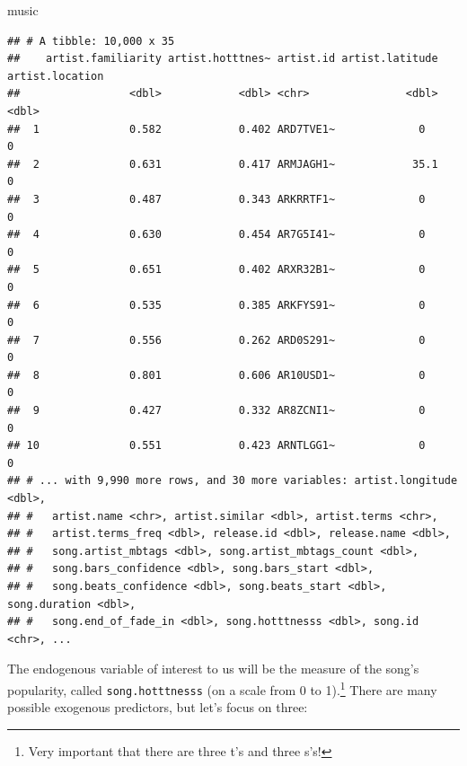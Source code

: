 \documentclass[
]{book}
\newenvironment{Shaded}{\begin{snugshade}}{\end{snugshade}}
\newcommand{\NormalTok}[1]{#1}
\begin{document}
\begin{Shaded}
\begin{Highlighting}[]
\NormalTok{music}
\end{Highlighting}
\end{Shaded}

\begin{verbatim}
## # A tibble: 10,000 x 35
##    artist.familiarity artist.hotttnes~ artist.id artist.latitude artist.location
##                 <dbl>            <dbl> <chr>               <dbl>           <dbl>
##  1              0.582            0.402 ARD7TVE1~             0                 0
##  2              0.631            0.417 ARMJAGH1~            35.1               0
##  3              0.487            0.343 ARKRRTF1~             0                 0
##  4              0.630            0.454 AR7G5I41~             0                 0
##  5              0.651            0.402 ARXR32B1~             0                 0
##  6              0.535            0.385 ARKFYS91~             0                 0
##  7              0.556            0.262 ARD0S291~             0                 0
##  8              0.801            0.606 AR10USD1~             0                 0
##  9              0.427            0.332 AR8ZCNI1~             0                 0
## 10              0.551            0.423 ARNTLGG1~             0                 0
## # ... with 9,990 more rows, and 30 more variables: artist.longitude <dbl>,
## #   artist.name <chr>, artist.similar <dbl>, artist.terms <chr>,
## #   artist.terms_freq <dbl>, release.id <dbl>, release.name <dbl>,
## #   song.artist_mbtags <dbl>, song.artist_mbtags_count <dbl>,
## #   song.bars_confidence <dbl>, song.bars_start <dbl>,
## #   song.beats_confidence <dbl>, song.beats_start <dbl>, song.duration <dbl>,
## #   song.end_of_fade_in <dbl>, song.hotttnesss <dbl>, song.id <chr>, ...
\end{verbatim}

The endogenous variable of interest to us will be the measure of the song's popularity, called \texttt{song.hotttnesss} (on a scale from 0 to 1).\footnote{Very important that there are three t's and three s's!} There are many possible exogenous predictors, but let's focus on three:
\end{document}
